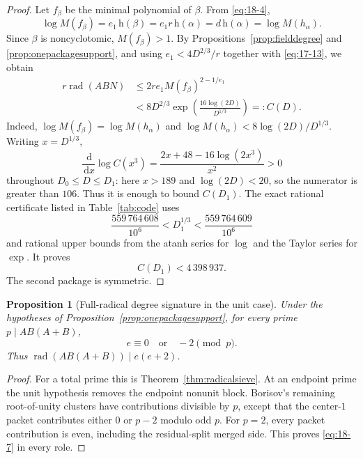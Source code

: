 \documentclass[11pt]{article}
\numberwithin{equation}{section}
\newtheorem{proposition}[theorem]{Proposition}
\theoremstyle{definition}
\newcommand{\dd}{\,\mathrm d}
\begin{document}
\begin{proof}
Let \(f_\beta\) be the minimal polynomial of \(\beta\).  From \eqref{eq:18-4},
\[
 \log M(f_\beta)
 =e_1\,\mathrm h(\beta)
 =e_1r\,\mathrm h(\alpha)
 =d\,\mathrm h(\alpha)
 =\log M(h_\alpha).
\]
Since \(\beta\) is noncyclotomic, \(M(f_\beta)>1\).  By
Propositions~\ref{prop:fielddegree} and \ref{prop:onepackagesupport}, and
using \(e_1<4D^{2/3}/r\) together with \eqref{eq:17-13}, we obtain
\[
 \begin{aligned}
 r\operatorname{rad}(ABN)
 &\leq2re_1M(f_\beta)^{2-1/e_1}\\
 &<8D^{2/3}
   \exp\!\left(\frac{16\log(2D)}{D^{1/3}}\right)
 =:C(D).
 \end{aligned}
\]
Indeed, \(\log M(f_\beta)=\log M(h_\alpha)\) and
\(\log M(h_\alpha)<8\log(2D)/D^{1/3}\).  Writing
\(x=D^{1/3}\),
\[
 \frac{\dd}{\dd x}\log C(x^3)
 =\frac{2x+48-16\log(2x^3)}{x^2}>0
\]
throughout \(D_0\leq D\leq D_1\): here \(x>189\) and
\(\log(2D)<20\), so the numerator is greater than \(106\).  Thus it is
enough to bound \(C(D_1)\).  The exact rational certificate listed in
Table~\ref{tab:code} uses
\[
 \frac{559\,764\,608}{10^6}<D_1^{1/3}
 <\frac{559\,764\,609}{10^6}
\]
and rational upper bounds from the atanh series for \(\log\) and the Taylor
series for \(\exp\).  It proves
\[
 C(D_1)<4\,398\,937.
\]
The second package is symmetric.
\end{proof}

\begin{proposition}[Full-radical degree signature in the unit case]
\label{prop:unitfullradical}
Under the hypotheses of Proposition~\ref{prop:onepackagesupport}, for every
prime \(p\mid AB(A+B)\),
\begin{equation}
 e\equiv0\quad\text{or}\quad-2\pmod p.
 \label{eq:18-7}
\end{equation}
Thus \(\operatorname{rad}(AB(A+B))\mid e(e+2)\).
\end{proposition}

\begin{proof}
For a total prime this is Theorem~\ref{thm:radicalsieve}.  At an endpoint
prime the unit hypothesis removes the endpoint nonunit block.  Borisov's
remaining root-of-unity clusters have contributions divisible by \(p\),
except that the center-\(1\) packet contributes either \(0\) or \(p-2\)
modulo odd \(p\).  For \(p=2\), every packet contribution is even, including
the residual-split merged side.  This proves \eqref{eq:18-7} in every role.
\end{proof}
\end{document}
